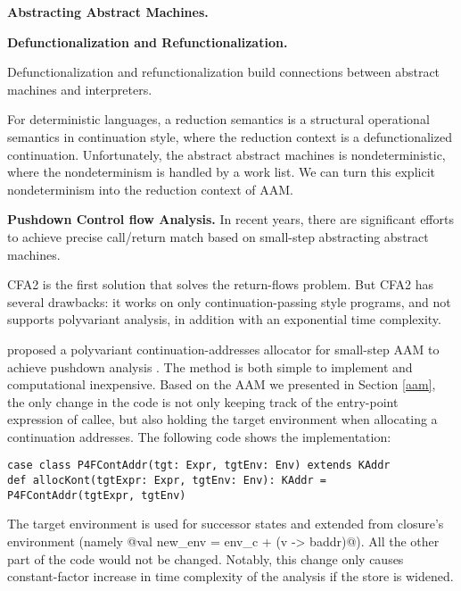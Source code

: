 \documentclass[acmsmall,review,anonymous]{acmart}\settopmatter{printfolios=true,printccs=false,printacmref=false}
\begin{document}
\textbf{Abstracting Abstract Machines.}

\textbf{Defunctionalization and Refunctionalization.}

Defunctionalization and refunctionalization build connections between abstract
machines and interpreters.

For deterministic languages, a reduction semantics is a structural operational
semantics in continuation style, where the reduction context is a
defunctionalized continuation.
Unfortunately, the abstract abstract machines is nondeterministic, where
the nondeterminism is handled by a work list.
We can turn this explicit nondeterminism into the reduction context of
AAM.


\textbf{Pushdown Control flow Analysis.}
In recent years, there are significant efforts \cite{vardoulakis2010cfa2, earl2012introspective,
gilray2016pushdown, johnson2015abstracting} to achieve precise call/return
match based on small-step abstracting abstract machines.

CFA2 is the first solution that solves the return-flows problem\cite{vardoulakis2010cfa2}.
But CFA2 has several drawbacks: it works on only continuation-passing style programs,
and not supports polyvariant analysis, in addition with an exponential time
complexity.


\citeauthor{gilray2016pushdown} proposed a polyvariant continuation-addresses allocator
for small-step AAM to achieve pushdown analysis \cite{gilray2016pushdown}.
The method is both simple to implement and computational inexpensive.
Based on the AAM we presented in Section \ref{aam}, the only change in the code is
not only keeping track of the entry-point expression of callee, but also holding the target environment
when allocating a continuation addresses.
The following code shows the implementation:

\begin{lstlisting}
case class P4FContAddr(tgt: Expr, tgtEnv: Env) extends KAddr
def allocKont(tgtExpr: Expr, tgtEnv: Env): KAddr = P4FContAddr(tgtExpr, tgtEnv)
\end{lstlisting}

The target environment is used for successor states and extended from closure's
environment (namely @val new_env = env_c + (v -> baddr)@).
All the other part of the code would not be changed.
Notably, this change only causes constant-factor increase in time complexity of
the analysis if the store is widened.
\end{document}
